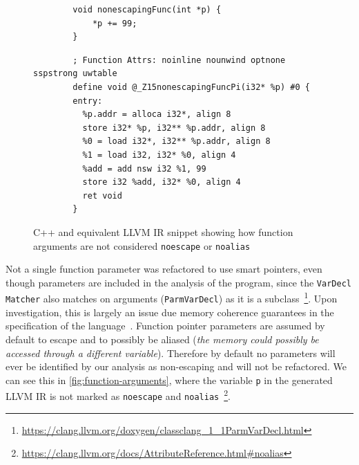\documentclass{mpaper}
\begin{document}
    \begin{figure}
        \centering
        \begin{verbatim}
        void nonescapingFunc(int *p) {
            *p += 99;
        }
        \end{verbatim}
        \begin{verbatim}
        ; Function Attrs: noinline nounwind optnone sspstrong uwtable
        define void @_Z15nonescapingFuncPi(i32* %p) #0 {
        entry:
          %p.addr = alloca i32*, align 8
          store i32* %p, i32** %p.addr, align 8
          %0 = load i32*, i32** %p.addr, align 8
          %1 = load i32, i32* %0, align 4
          %add = add nsw i32 %1, 99
          store i32 %add, i32* %0, align 4
          ret void
        }
        \end{verbatim}
        \caption{C++ and equivalent LLVM IR snippet showing how function arguments are not considered \texttt{noescape} or \texttt{noalias}}
        \label{fig:function-arguments}
    \end{figure}
    
    Not a single function parameter was refactored to use smart pointers, even though parameters are included in the analysis of the program, since the \texttt{VarDecl Matcher} also matches on arguments (\texttt{ParmVarDecl}) as it is a subclass~\footnote{\url{https://clang.llvm.org/doxygen/classclang_1_1ParmVarDecl.html}}.
    Upon investigation, this is largely an issue due memory coherence guarantees in the specification of the language~\cite[p.~66]{C++17}. 
    Function pointer parameters are assumed by default to escape and to possibly be aliased (\textit{the memory could possibly be accessed through a different variable}).
    Therefore by default no parameters will ever be identified by our analysis as non-escaping and will not be refactored.
    We can see this in \autoref{fig:function-arguments}, where the variable \texttt{p} in the generated LLVM IR is not marked as \texttt{noescape} and \texttt{noalias}~\footnote{\url{https://clang.llvm.org/docs/AttributeReference.html\#noalias}}.
    
\end{document}
